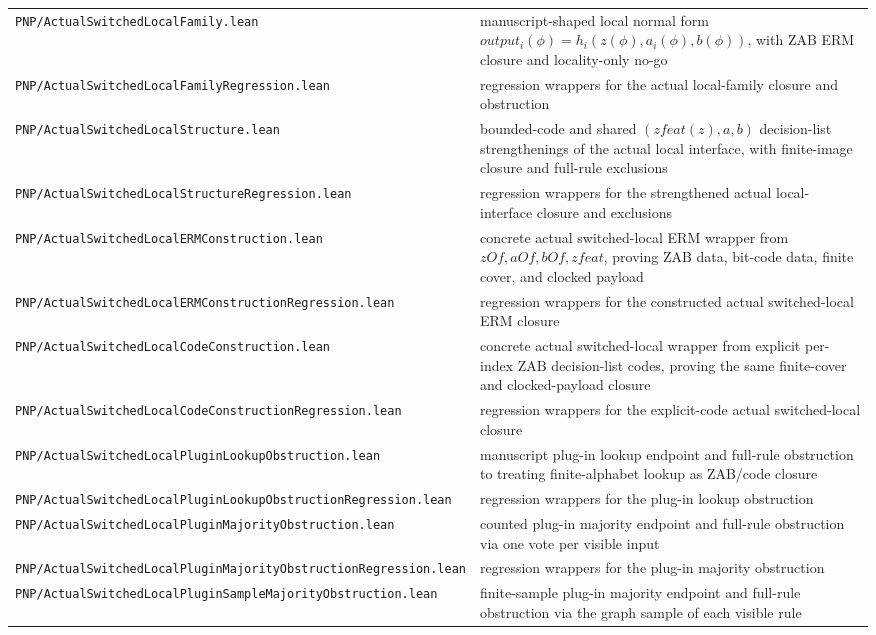 \documentclass[11pt]{article}
\theoremstyle{remark}
\begin{document}
\begin{center}
\begin{tabular}{ll}
\texttt{PNP/ActualSwitchedLocalFamily.lean} & manuscript-shaped local normal form \(output_i(\phi)=h_i(z(\phi),a_i(\phi),b(\phi))\), with ZAB ERM closure and locality-only no-go \\
\texttt{PNP/ActualSwitchedLocalFamilyRegression.lean} & regression wrappers for the actual local-family closure and obstruction \\
\texttt{PNP/ActualSwitchedLocalStructure.lean} & bounded-code and shared \((zfeat(z),a,b)\) decision-list strengthenings of the actual local interface, with finite-image closure and full-rule exclusions \\
\texttt{PNP/ActualSwitchedLocalStructureRegression.lean} & regression wrappers for the strengthened actual local-interface closure and exclusions \\
\texttt{PNP/ActualSwitchedLocalERMConstruction.lean} & concrete actual switched-local ERM wrapper from \(zOf,aOf,bOf,zfeat\), proving ZAB data, bit-code data, finite cover, and clocked payload \\
\texttt{PNP/ActualSwitchedLocalERMConstructionRegression.lean} & regression wrappers for the constructed actual switched-local ERM closure \\
\texttt{PNP/ActualSwitchedLocalCodeConstruction.lean} & concrete actual switched-local wrapper from explicit per-index ZAB decision-list codes, proving the same finite-cover and clocked-payload closure \\
\texttt{PNP/ActualSwitchedLocalCodeConstructionRegression.lean} & regression wrappers for the explicit-code actual switched-local closure \\
\texttt{PNP/ActualSwitchedLocalPluginLookupObstruction.lean} & manuscript plug-in lookup endpoint and full-rule obstruction to treating finite-alphabet lookup as ZAB/code closure \\
\texttt{PNP/ActualSwitchedLocalPluginLookupObstructionRegression.lean} & regression wrappers for the plug-in lookup obstruction \\
\texttt{PNP/ActualSwitchedLocalPluginMajorityObstruction.lean} & counted plug-in majority endpoint and full-rule obstruction via one vote per visible input \\
\texttt{PNP/ActualSwitchedLocalPluginMajorityObstructionRegression.lean} & regression wrappers for the plug-in majority obstruction \\
\texttt{PNP/ActualSwitchedLocalPluginSampleMajorityObstruction.lean} & finite-sample plug-in majority endpoint and full-rule obstruction via the graph sample of each visible rule \\

\end{tabular}
\end{center}
\end{document}
